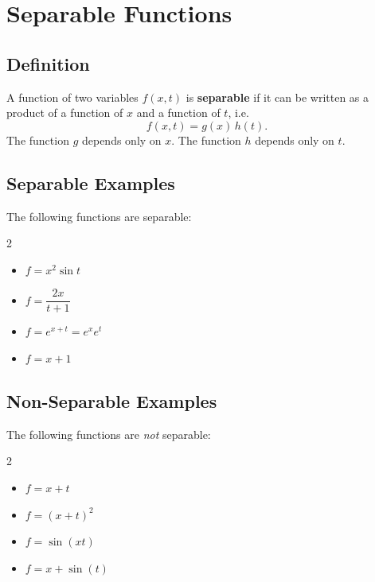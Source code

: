 \documentclass[10pt,letterpaper]{article}
\begin{document}

\section{Separable Functions} 

\subsection{Definition}
A function of two variables $f(x,t)$ is \textbf{separable} if it can be written as a product of a function of $x$ and a function of $t$, i.e.
\[
f(x,t) = g(x)\,h(t).
\]
The function $g$ depends only on $x$. The function $h$ depends only on $t$.

\subsection{Separable Examples}
The following functions are separable:
\begin{multicols}{2}
\begin{itemize}
    \item $f = x^2 \sin t $\\[0.5mm]
    \item $f = \dfrac{2x}{t+1}$
    \item $f = e^{x+t}=e^xe^t$\\[0.5mm]
    \item $f = x+1$ 
\end{itemize}
\end{multicols}
\subsection{Non-Separable Examples}
The following functions are \emph{not} separable:
\begin{multicols}{2}
\begin{itemize}
    \item $f = x + t$\\[0.5mm]
    \item $f = (x+t)^2$
    \item $f = \sin(xt)$\\[0.5mm]
    \item $f = x +\sin(t)$
\end{itemize}
\end{multicols}
\end{document}
